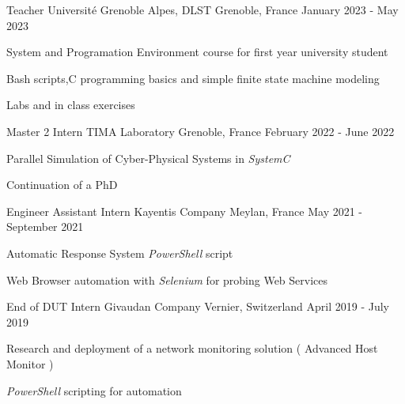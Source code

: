 

\begin{cventries}

    \cventry
    {Teacher} %
    {Université Grenoble Alpes, DLST} %
    {Grenoble, France} %
    {January 2023 - May 2023} %
    {
      \begin{cvitems} %
      \item{System and Programation Environment course for first year university student}
      \item{Bash scripts,C programming basics and simple finite state machine modeling}
      \item{Labs and in class exercises}
      \end{cvitems}
    }

  \cventry
    {Master 2 Intern} %
    {TIMA Laboratory} %
    {Grenoble, France} %
    {February 2022 - June 2022} %
    {
      \begin{cvitems} %
        \item{Parallel Simulation of Cyber-Physical Systems in \emph{SystemC}}
        \item{Continuation of a PhD}
      \end{cvitems}
    }

  \cventry
    {Engineer Assistant Intern} %
    {Kayentis Company} %
    {Meylan, France} %
    {May 2021 - September 2021} %
    {
      \begin{cvitems} %
        \item {Automatic Response System \emph{PowerShell} script}
        \item {Web Browser automation with \emph{Selenium} for probing Web Services}
      \end{cvitems}
    }

  \cventry
    {End of DUT Intern} %
    {Givaudan Company} %
    {Vernier, Switzerland} %
    {April 2019 - July 2019} %
    {
      \begin{cvitems} %
        \item {Research and deployment of a network monitoring solution ( Advanced Host Monitor )}
        \item {\emph{PowerShell} scripting for automation}
      \end{cvitems}
    }
  

\end{cventries}
